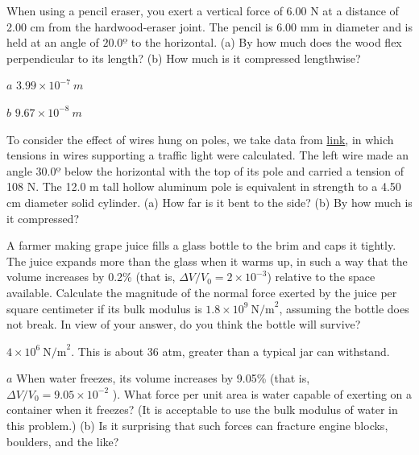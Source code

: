 \documentclass[
]{book}
\begin{document}
\hypertarget{fs-id1165296255735}{}
\leavevmode{}%
When using a pencil eraser, you exert a vertical force of 6.00 N at a
distance of 2.00 cm from the hardwood-eraser joint. The pencil is 6.00
mm in diameter and is held at an angle of \(\text{20.0º}\) to the
horizontal. (a) By how much does the wood flex perpendicular to its
length? (b) How much is it compressed lengthwise?

\leavevmode{}%
\(a\) \({3\text{.}{\text{99} \times \text{10}^{- 7}}\ m}{}\)

\(b\) \({9\text{.}{\text{67} \times \text{10}^{- 8}}\ m}{}\)

\hypertarget{fs-id1165298783085}{}
\leavevmode{}%
To consider the effect of wires hung on poles, we take data from
\href{/m54876\#fs-id1348788}{link}, in which tensions
in wires supporting a traffic light were calculated. The left wire made
an angle \(\text{30.0º}\) below the horizontal with the top of its pole
and carried a tension of 108 N. The 12.0 m tall hollow aluminum pole is
equivalent in strength to a 4.50 cm diameter solid cylinder. (a) How far
is it bent to the side? (b) By how much is it compressed?

\hypertarget{fs-id1165298713046}{}
\leavevmode{}%
A farmer making grape juice fills a glass bottle to the brim and caps it
tightly. The juice expands more than the glass when it warms up, in such
a way that the volume increases by 0.2\% (that is,
\({{\Delta V/V_{0}} = {2 \times \text{10}^{- 3}}}{}\)) relative to the
space available. Calculate the magnitude of the normal force exerted by
the juice per square centimeter if its bulk modulus is
\({1\text{.}{8 \times \text{10}^{9}}\ \text{N/m}^{2}}{}\), assuming the
bottle does not break. In view of your answer, do you think the bottle
will survive?

\leavevmode{}%
\({{4 \times \text{10}^{6}}\ \text{N/m}^{2}}{}\). This is about 36 atm,
greater than a typical jar can withstand.

\hypertarget{fs-id1165298913397}{}
\leavevmode{}%
\(a\) When water freezes, its volume increases by 9.05\% (that is,
\({{\Delta V/V_{0}} = 9}\text{.}{\text{05} \times \text{10}^{- 2}}\) ).
What force per unit area is water capable of exerting on a container
when it freezes? (It is acceptable to use the bulk modulus of water in
this problem.) (b) Is it surprising that such forces can fracture engine
blocks, boulders, and the like?
\end{document}
